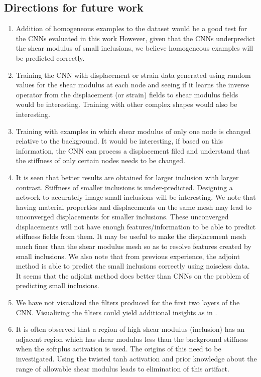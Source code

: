 \documentclass[12pt]{article}
\begin{document}
\subsection{Directions for future work}
\begin{enumerate}
\item{Addition of homogeneous examples to the dataset would be a good test for the CNNs evaluated in this work However, given that the CNNs underpredict the shear modulus of small inclusions, we believe homogeneous examples will be predicted correctly.}
\item{Training the CNN with displacement or strain data generated using random values for the shear modulus at each node and seeing if it learns the inverse operator from the displacement (or strain) fields to shear modulus fields would be interesting. Training with other complex shapes would also be interesting.}
\item{Training with examples in which shear modulus of only one node is changed relative to the background. It would be interesting, if based on this information, the CNN can process a displacement filed and understand that the stiffness of only certain nodes needs to be changed.}
\item{It is seen that better results are obtained for larger inclusion with larger contrast. Stiffness of smaller inclusions is under-predicted. Designing a network to accurately image small inclusions will be interesting. We note that having material properties and displacements on the same mesh may lead to unconverged displacements for smaller inclusions. These unconverged displacements will not have enough features/information to be able to predict stiffness fields from them. It may be useful to make the displacement mesh much finer than the shear modulus mesh so as to resolve features created by small inclusions. We also note that from previous experience, the adjoint method \cite{paper:oberai2003} is able to predict the small inclusions correctly using noiseless data. It seems that the adjoint method does better than CNNs on the problem of predicting small inclusions.}
\item{We have not visualized the filters produced for the first two layers of the CNN. Visualizing the filters could yield additional insights as in \cite{paper:pateloberai2019}.}
\item{It is often observed that a region of high shear modulus (inclusion) has an adjacent region which has shear modulus less than the background stiffness when the softplus activation is used. The origins of this need to be investigated. Using the twisted tanh activation and prior knowledge about the range of allowable shear modulus leads to elimination of this artifact.}

\end{enumerate}
\end{document}
